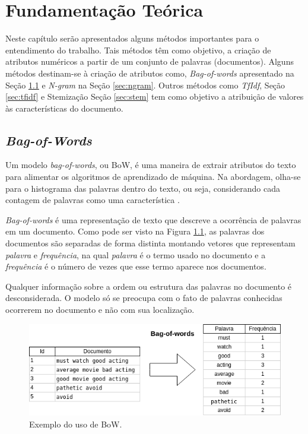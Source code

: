 \chapter{Fundamentação Teórica}\label{cap:fundamentacaoteorica}

Neste capítulo serão apresentados alguns métodos importantes para o entendimento do trabalho. Tais métodos têm como objetivo,  a criação de atributos numéricos a partir de um conjunto de palavras (documentos). Alguns métodos destinam-se à criação de atributos como, \textit{Bag-of-words} apresentado na Seção  \ref{sec:bag-of-words} e \textit{N-gram} na Seção \ref{sec:ngram}. Outros métodos como \textit{TfIdf}, Seção \ref{sec:tfidf} e Stemização Seção \ref{sec:stem} tem como objetivo a atribuição de valores às características do documento.


\section{\textit{Bag-of-Words}}\label{sec:bag-of-words}
Um modelo \textit{bag-of-words}, ou BoW, é uma maneira de extrair atributos do texto para alimentar os algoritmos de aprendizado de máquina. Na abordagem, olha-se para o histograma das palavras dentro do texto, ou seja, considerando cada contagem de palavras como uma característica \cite{goldberg2017neural}. 

\textit{Bag-of-words} é uma representação de texto que descreve a ocorrência de palavras em um documento. Como pode ser visto na Figura \ref{fig:exemplo-bow}, as palavras dos documentos são separadas de forma distinta montando vetores que representam {\it palavra} e {\it frequência}, na qual {\it palavra} é o termo usado no documento e a {\it frequência} é o número de vezes que esse termo aparece nos documentos.

Qualquer informação sobre a ordem ou estrutura das palavras no documento é desconsiderada. O modelo só se preocupa com o fato de palavras conhecidas ocorrerem no documento e não com sua localização.

\begin{figure}[ht]
  \centering
  \includegraphics[height=0.2\textheight]{figuras/exemplos/bow-exemplo.png}
  \caption{Exemplo do uso de BoW.}
  \label{fig:exemplo-bow}
\end{figure}


